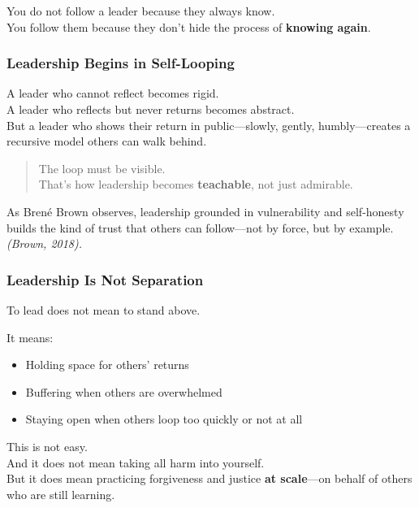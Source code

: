 You do not follow a leader because they always know.\\
You follow them because they don't hide the process of \textbf{knowing
again}.

\subsubsection{\texorpdfstring{\textbf{Leadership Begins in
Self-Looping}}{Leadership Begins in Self-Looping}}\label{leadership-begins-in-self-looping}

A leader who cannot reflect becomes rigid.\\
A leader who reflects but never returns becomes abstract.\\
But a leader who shows their return in public---slowly, gently,
humbly---creates a recursive model others can walk behind.

\begin{quote}
The loop must be visible.\\
That's how leadership becomes \textbf{teachable}, not just admirable.
\end{quote}

As Brené Brown observes, leadership grounded in vulnerability and
self-honesty builds the kind of trust that others can follow---not by
force, but by example. \emph{(Brown, 2018).}

\subsubsection{\texorpdfstring{\textbf{Leadership Is Not
Separation}}{Leadership Is Not Separation}}\label{leadership-is-not-separation}

To lead does not mean to stand above.

It means:

\begin{itemize}
\item
  Holding space for others' returns
\item
  Buffering when others are overwhelmed
\item
  Staying open when others loop too quickly or not at all
\end{itemize}

This is not easy.\\
And it does not mean taking all harm into yourself.\\
But it does mean practicing forgiveness and justice \textbf{at
scale}---on behalf of others who are still learning.

